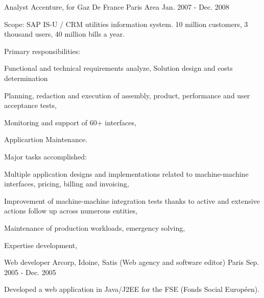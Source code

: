 \begin{cventries}
  \cventry
    {Analyst} %
    {Accenture, for Gaz De France} %
    {Paris Area} %
    {Jan. 2007 - Dec. 2008} %
    {
      \begin{cvitems} %
        \item {Scope: SAP IS-U / CRM utilities information system. 10 million customers, 3 thousand users, 40 million bills a year.}
        \item {Primary responsibilities:}
        \begin{cvsubitems}
          \item {Functional and technical requirements analyze, Solution design and costs determination}
          \item {Planning, redaction and execution of assembly, product, performance and user acceptance tests,}
          \item {Monitoring and support of 60+ interfaces,}
          \item {Applicartion Maintenance.}
        \end{cvsubitems}
        \item {Major tasks accomplished:}
        \begin{cvsubitems}
          \item {Multiple application designs and implementations related to machine-machine interfaces, pricing, billing and invoicing,}
          \item {Improvement of machine-machine integration tests thanks to active and extensive actions follow up across numerous entities,}
          \item {Maintenance of production workloads, emergency solving,}
          \item {Expertise development,}
        \end{cvsubitems}
      \end{cvitems}
    }

  \cventry
    {Web developer} %
    {Arcorp, Idoine, Satis (Web agency and software editor)} %
    {Paris} %
    {Sep. 2005 - Dec. 2005} %
    {
      \begin{cvitems} %
        \item {Developed a web application in Java/J2EE for the FSE (Fonds Social Européen).}
      \end{cvitems}
    }

\end{cventries}
